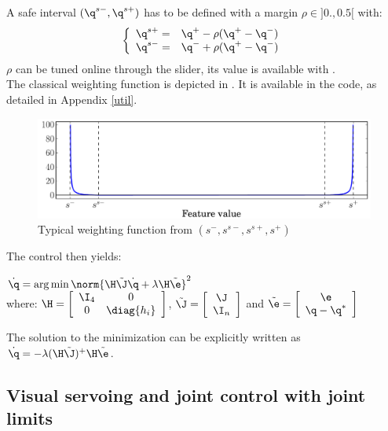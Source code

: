 \documentclass{ecnreport}
\begin{document}
A safe interval $(\q^{s-}, \q^{s+})$ has to be defined with a margin $\rho\in]0.,0.5[$ with:
\begin{equation*}
\left\{\begin{array}{ll}
	\q^{s+} = & \q^{+} - \rho(\q^+ - \q^-) \\
	\q^{s-} = & \q^{-} + \rho(\q^+ - \q^-)
\end{array}\right.
\end{equation*}$\rho$ can be tuned online through the slider, its value is available with .\\

The classical weighting function is depicted in . It is available in the code, as detailed in Appendix \ref{util}.
\begin{figure}[h]\centering
	\includegraphics[width=.7\linewidth]{constraint_0inf}
	\caption{Typical weighting function from $(s^-, s^{s-}, s^{s+}, s^+)$}
	\label{weight}		
\end{figure}

The control then yields: 
\begin{center}
	$\dot \q = \arg\min \norm{\H\tilde\J\dot \q + \lambda\H\tilde\e}^2$ \\
 where: $\H = \left[\begin{array}{cc}\I_4 & 0 \\ 0 & \diag{h_i}\end{array}\right]$,
 $\tilde\J = \left[\begin{array}{c}\J \\ \I_n \end{array}\right]$ and
  $\tilde\e = \left[\begin{array}{c}\e \\ \q - \q^* \end{array}\right]$
\end{center}
The solution to the minimization can be explicitly written as $\dot \q = -\lambda(\H\tilde\J)^+\H\tilde\e$.\\

\subsection{Visual servoing and joint control with joint limits }
\end{document}
